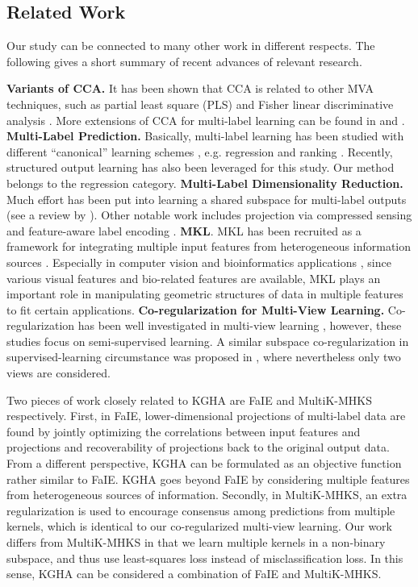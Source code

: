 \documentclass[a4paper]{article}
\newcommand{\shortcite}[1]{\cite{#1}}
\begin{document}
\subsection{Related Work}
Our study can be connected to many other work in different respects. The following gives a short summary of recent advances of relevant research. 

\textbf{Variants of CCA.} It has been shown that CCA is related to other MVA techniques, such as partial least square (PLS) \citep{Sun_2009_IJCAI}  and  Fisher linear discriminative 
analysis \citep{Sun_2011_PAMI}. More extensions of CCA for multi-label learning can be found in \citeauthor{HardoonSS04} \shortcite{HardoonSS04} and \citeauthor{Sun_2011_PAMI} \shortcite{Sun_2011_PAMI}.   
\textbf{Multi-Label Prediction.} Basically, multi-label learning has been studied with different ``canonical'' learning schemes , e.g. regression
\citep{Hsu_NIPS_2009,lin_2014_icml} and ranking \citep{RankSVM}. Recently, structured output learning has also been 
leveraged \citep{Hariharan_icml_2010,Xiong_esann_2014} for this study. Our method belongs to the regression category.  
\textbf{Multi-Label Dimensionality Reduction.} Much effort has been put into learning a shared subspace for multi-label outputs (see a review by \citeauthor{sun_MLDR} \citeyear{sun_MLDR}).
Other notable work includes projection via compressed sensing \citep{Hsu_NIPS_2009} and feature-aware label encoding  \citep{lin_2014_icml}. 
\textbf{MKL}. MKL has been recruited as a framework for integrating multiple input features from heterogeneous information 
sources \citep{MKL}. Especially in computer vision and bioinformatics applications \citep{MKL_cv, Mostafavi_2010_Bioinfo}, since various visual features and bio-related features are available, MKL plays an important role in 
manipulating geometric structures of data in multiple features to fit certain applications.  \textbf{Co-regularization for Multi-View Learning.} 
Co-regularization has been well investigated in multi-view learning \citep{Rosenberg_2007_AISTATS,Sridharan_2008_COLT}, however, these studies focus on semi-supervised learning. A similar 
subspace co-regularization in supervised-learning circumstance was proposed in \citeauthor{Guo_2012_ICML} \citep{Guo_2012_ICML}, where nevertheless only two views are considered.  

Two pieces of work closely related to KGHA are FaIE \citep{lin_2014_icml} and MultiK-MHKS \citep{MKL} respectively. 
First, in FaIE, lower-dimensional projections of multi-label data are found by jointly optimizing the correlations between input features and 
projections and recoverability of projections back to the original output data. From a different perspective, KGHA can be formulated as an objective function rather 
similar to FaIE. KGHA goes beyond FaIE by considering multiple features from heterogeneous sources of information. 
Secondly, in MultiK-MHKS, an extra regularization is used to encourage consensus among predictions from multiple kernels, which is identical to 
our co-regularized multi-view learning. Our work differs from MultiK-MHKS in that we learn multiple kernels in a non-binary subspace, and 
thus use least-squares loss instead of misclassification loss.   
In this sense, KGHA can be considered a combination of FaIE and MultiK-MHKS. 
\end{document}
